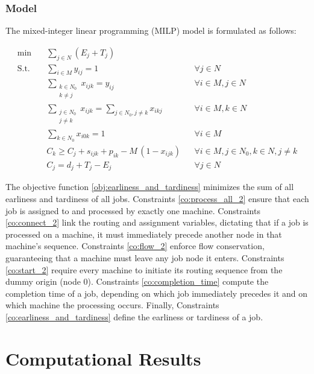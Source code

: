 \documentclass{article}
\begin{document}
\subsubsection{Model}

The mixed-integer linear programming (MILP) model is formulated as follows:

\begin{align}
    \min \quad & \sum_{j \in N} (E_j + T_j) \label{obj:earliness_and_tardiness} \\
    \text{S.t.} \quad & \sum_{i \in M} y_{ij} = 1 && \forall j \in N \label{co:process_all_2} \\
    & \sum_{\substack{k \in N_0\\k \neq j}} x_{ijk} = y_{ij} && \forall i \in M, j \in N \label{co:connect_2} \\
    & \sum_{\substack{j \in N_0\\j \neq k}} x_{ijk} = \sum_{j \in N_0, j \neq k} x_{ikj} && \forall i \in M, k \in N \label{co:flow_2} \\
    & \sum_{k \in N_0} x_{i0k} = 1 && \forall i \in M \label{co:start_2} \\
    & C_k \geq C_j + s_{ijk} + p_{ik} - M \, (1 - x_{ijk}) && \forall i \in M, j \in N_0, k \in N, j \neq k \label{co:completion_time} \\
    & C_j = d_j + T_j - E_j && \forall j \in N \label{co:earliness_and_tardiness}
\end{align}

The objective function \eqref{obj:earliness_and_tardiness} minimizes the sum of all earliness and tardiness of all jobs. 
Constraints \eqref{co:process_all_2} ensure that each job is assigned to and processed by exactly one machine. 
Constraints \eqref{co:connect_2} link the routing and assignment variables, dictating that if a job is processed on a machine, it must immediately precede another node in that machine's sequence. 
Constraints \eqref{co:flow_2} enforce flow conservation, guaranteeing that a machine must leave any job node it enters. 
Constraints \eqref{co:start_2} require every machine to initiate its routing sequence from the dummy origin (node 0). 
Constraints \eqref{co:completion_time} compute the completion time of a job, depending on which job immediately precedes it and on which machine the processing occurs. 
Finally, Constraints \eqref{co:earliness_and_tardiness} define the earliness or tardiness of a job.

\section{Computational Results}
\end{document}
